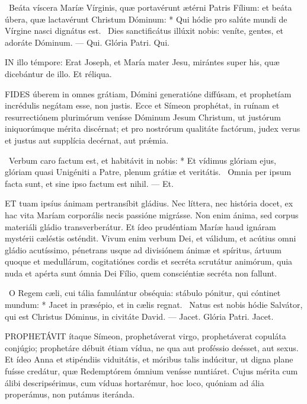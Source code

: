 \R\ Beáta víscera Maríæ Vírginis, quæ portavérunt ætérni Patris Fílium: et beáta úbera, quæ lactavérunt Christum Dóminum: * Qui hódie pro salúte mundi de Vírgine nasci dignátus est. \V\ Dies sanctificátus illúxit nobis: veníte, gentes, et adoráte Dóminum. --- Qui. Glória Patri. Qui.




\lettrine[lines=2]{I}{N} illo témpore: Erat Joseph, et María mater Jesu, mirántes super his, quæ dicebántur de illo. Et réliqua.



\lettrine[lines=2]{F}{IDES} úberem in omnes grátiam, Dómini generatióne diffúsam, et prophetíam incrédulis negátam esse, non justis. Ecce et Símeon prophétat, in ruínam et resurrectiónem plurimórum venísse Dóminum Jesum Christum, ut justórum iniquorúmque mérita discérnat; et pro nostrórum qualitáte factórum, judex verus et justus aut supplícia decérnat, aut prǽmia.

\R\ Verbum caro factum est, et habitávit in nobis: * Et vídimus glóriam ejus, glóriam quasi Unigéniti a Patre, plenum grátiæ et veritátis. \V\ Omnia per ipsum facta sunt, et sine ipso factum est nihil. --- Et.


\lettrine[lines=2]{E}{T} tuam ipsíus ánimam pertransíbit gládius. Nec líttera, nec história docet, ex hac vita Maríam corporális necis passióne migrásse. Non enim ánima, sed corpus materiáli gládio transverberátur. Et ídeo prudéntiam Maríæ haud ignáram mystérii cæléstis osténdit. Vivum enim verbum Dei, et válidum, et acútius omni gládio acutíssimo, pénetrans usque ad divisiónem ánimæ et spíritus, ártuum quoque et medullárum, cogitatiónes cordis et secréta scrutátur animórum, quia nuda et apérta sunt ómnia Dei Fílio, quem consciéntiæ secréta non fallunt.

\R\ O Regem cæli, cui tália famulántur obséquia: stábulo pónitur, qui cóntinet mundum: * Jacet in præsépio, et in cælis regnat. \V\ Natus est nobis hódie Salvátor, qui est Christus Dóminus, in civitáte David. --- Jacet. Glória Patri. Jacet.


\lettrine[lines=2]{P}{ROPHETÁVIT} ítaque Símeon, prophetáverat virgo, prophetáverat copuláta conjúgio; prophetáre débuit étiam vídua, ne qua aut proféssio deésset, aut sexus. Et ídeo Anna et stipéndiis viduitátis, et móribus talis indúcitur, ut digna plane fuísse credátur, quæ Redemptórem ómnium venísse nuntiáret. Cujus mérita cum álibi descripsérimus, cum víduas hortarémur, hoc loco, quóniam ad ália properámus, non putámus iteránda.

